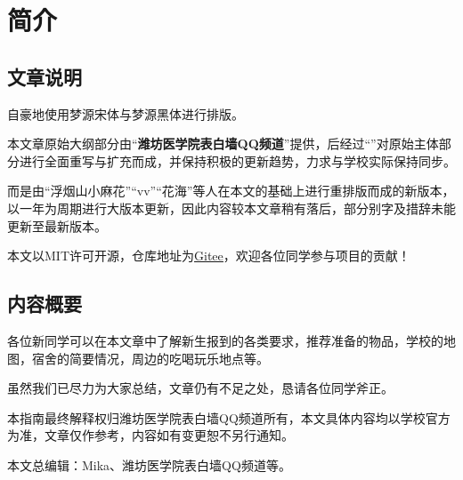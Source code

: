 \chapter[简介]{简介}
\section[文章说明]{文章说明}

自豪地使用梦源宋体与梦源黑体进行排版。

本文章原始大纲部分由“\textbf{潍坊医学院表白墙QQ频道}”提供，后经过“\textbf{}”对原始主体部分进行全面重写与扩充而成，并保持积极的更新趋势，力求与学校实际保持同步。

而\textbf{}是由“浮烟山小麻花”“vv”“花海”等人在本文的基础上进行重排版而成的新版本，以一年为周期进行大版本更新，因此内容较本文章稍有落后，部分别字及措辞未能更新至最新版本。

\bigbreak
\textbf{}

本文以MIT许可开源，仓库地址为\uline{\href{https://gitee.com/mikazo/guide_for_freshman}{Gitee}}，欢迎各位同学参与项目的贡献！

\section[内容概要]{内容概要}

各位新同学可以在本文章中了解新生报到的各类要求，推荐准备的物品，学校的地图，宿舍的简要情况，周边的吃喝玩乐地点等。

虽然我们已尽力为大家总结，文章仍有不足之处，恳请各位同学斧正。

本指南最终解释权归潍坊医学院表白墙QQ频道所有，本文具体内容均以学校官方为准，文章仅作参考，内容如有变更恕不另行通知。

本文总编辑：Mika、潍坊医学院表白墙QQ频道等。